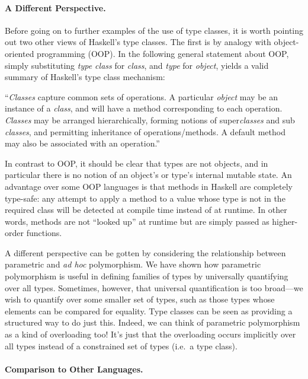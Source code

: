 \paragraph*{A Different Perspective.}
Before going on to further examples of the use of type classes, it is
worth pointing out two other views of Haskell's type classes.
The first is by analogy with object-oriented programming (OOP).  In the
following general statement about OOP, simply substituting {\em type
class} for {\em class}, and {\em type} for {\em object}, yields a valid
summary of Haskell's type class mechanism:

``{\em Classes} capture common sets of operations.  A particular
{\em object} may be an instance of a {\em class}, and will have a
method corresponding to each operation.  {\em Classes} may be arranged
hierarchically, forming notions of super{\em classes} and sub{\em
classes}, and permitting inheritance of operations/methods.
A default method may also be associated with an operation.''

In contrast to OOP, it should be clear that types are not
objects, and in particular there is no notion of an object's or type's
internal mutable state.  An advantage over some OOP languages is that
methods in 
Haskell are completely type-safe: any attempt to apply a method to a
value whose type is not in the required class will be detected at
compile time instead of at runtime.  In other words, methods are not
``looked up'' at runtime but are simply passed as higher-order
functions.

A different perspective can be gotten by considering the relationship
between parametric and {\em ad hoc} polymorphism.  We have shown how
parametric polymorphism is useful in defining families of types by
universally quantifying over all types.  Sometimes, however,
that universal quantification is too broad---we wish to quantify over
some smaller set of types, such as those types whose elements can be
compared for equality.  Type classes can be seen as providing a
structured way to do just this.  Indeed, we can think of parametric
polymorphism as a kind of overloading too!  It's just that the
overloading occurs implicitly over all types instead of a constrained
set of types (i.e.~a type class).

\paragraph*{Comparison to Other Languages.}

